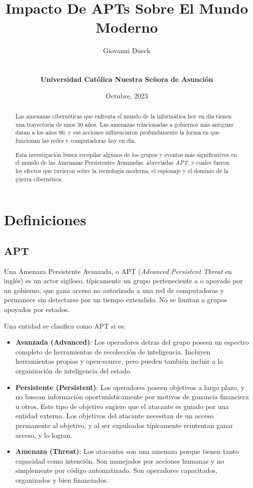 \documentclass{article}
\title{Impacto De APTs Sobre El Mundo Moderno}
\author{Giovanni Dueck\\\UrlFont{giodueck@gmail.com}\\\\{\bf Universidad Católica Nuestra Señora de Asunción}}
\date{Octubre, 2023}
\begin{document}
\maketitle

\begin{abstract}

Las amenazas cibernéticas que enfrenta el mundo de la informática hoy en día tienen una trayectoria de unos 30 años. Las amenazas relacionadas a gobiernos más antiguas datan a los años 90, y sus acciones influenciaron profundamente la forma en que funcionan las redes y computadoras hoy en día.

Esta investigación busca recopilar algunos de los grupos y eventos más significativos en el mundo de las Amenazas Persistentes Avanzadas, abreviadas {\it APT}, y cuales fueron los efectos que tuvieron sobre la tecnología moderna, el espionaje y el dominio de la guerra cibernética.

\end{abstract}

\section{Definiciones}
\subsection{APT}
Una Amenaza Persistente Avanzada, o APT ({\it Advanced Persistent Threat} en inglés) es un actor sigiloso, típicamente un grupo perteneciente a o apoyado por un gobierno, que gana acceso no autorizado a una red de computadoras y permanece sin detectarse por un tiempo extendido. No se limitan a grupos apoyados por estados. \autocite{cybereason-apt} 

Una entidad se clasifica como APT si es:
\begin{itemize}
    \item {\bf Avanzada (Advanced)}: Los operadores detras del grupo poseen un espectro completo de herramientas de recolección de inteligencia. Incluyen herramientas propias y open-source, pero pueden también incluir a la organización de inteligencia del estado.
    \item {\bf Persistente (Persistent)}: Los operadores poseen objetivos a largo plazo, y no buscan información oportunísticamente por motivos de ganancia financiera u otros. Este tipo de objetivo sugiere que el atacante es guiado por una entidad externa. Los objetivos del atacante necesitan de un acceso permanente al objetivo, y al ser expulsados típicamente reintentan ganar acceso, y lo logran.
    \item {\bf Amenaza (Threat)}: Los atacantes son una amenaza porque tienen tanto capacidad como intención. Son manejados por acciones humanas y no simplemente por código automatizado. Son operadores capacitados, organizados y bien financiados. \autocite{itgov-apt}
\end{itemize}
\end{document}
